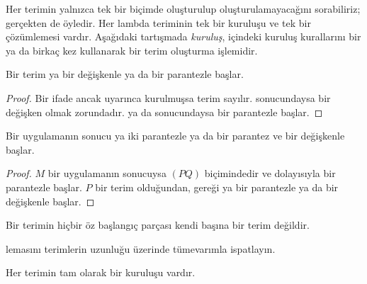


Her terimin yalnızca tek bir biçimde oluşturulup oluşturulamayacağını
sorabiliriz; gerçekten de öyledir. Her lambda teriminin tek bir kuruluşu ve
tek bir çözümlemesi vardır. Aşağıdaki tartışmada \emph{kuruluş},
 içindeki kuruluş kurallarını bir ya da birkaç kez
kullanarak bir terim oluşturma işlemidir.

\begin{lem}
Bir terim ya bir değişkenle ya da bir parantezle başlar.
\end{lem}

\begin{proof}
Bir ifade ancak  uyarınca kurulmuşsa terim sayılır.
 sonucundaysa bir değişken olmak zorundadır.
 ya da  sonucundaysa bir
parantezle başlar.
\end{proof}

\begin{lem}
Bir uygulamanın sonucu ya iki parantezle ya da bir parantez ve bir değişkenle
başlar.
\end{lem}

\begin{proof}
$M$ bir uygulamanın sonucuysa $(PQ)$ biçimindedir ve dolayısıyla bir
parantezle başlar. $P$ bir terim olduğundan,  gereği ya
bir parantezle ya da bir değişkenle başlar.
\end{proof}

\begin{lem}
Bir terimin hiçbir öz başlangıç parçası kendi başına bir terim değildir.
\end{lem}

\begin{prob}
 lemasını terimlerin uzunluğu üzerinde
tümevarımla ispatlayın.
\end{prob}

\begin{prop} 
Her terimin tam olarak bir kuruluşu vardır.
\end{prop}


